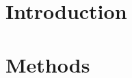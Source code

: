 \documentclass[12pt, %
               openright, %
               oneside, %
               a4paper, %
               chapter=TITLE, %
               section=TITLE, %
               brazil,
               english %
]{abntex2}
\begin{document}
\listoftables*
\cleardoublepage
\makeatletter
\renewcommand\numberline[1]{
	\leftskip -0.7em
	\rightskip 1.6em
	\parfillskip -\rightskip
	\parindent 0em
	\@tempdima 2.0em
	\vspace{0em}
  \advance\leftskip \@tempdima \null\nobreak\hskip -\leftskip
	ALGORITHM \normalfont #1 ~~ }
\makeatother
\listofalgorithms
\cleardoublepage
\makeatletter
\def\numberline#1{\hb@xt@\@tempdima{#1\hfil}}
\makeatother
\tableofcontents*
\cleardoublepage
\textual
\chapter{Introduction}
\label{cap:intro}

\chapter{Methods}
\label{cap:methods}

\end{document}
